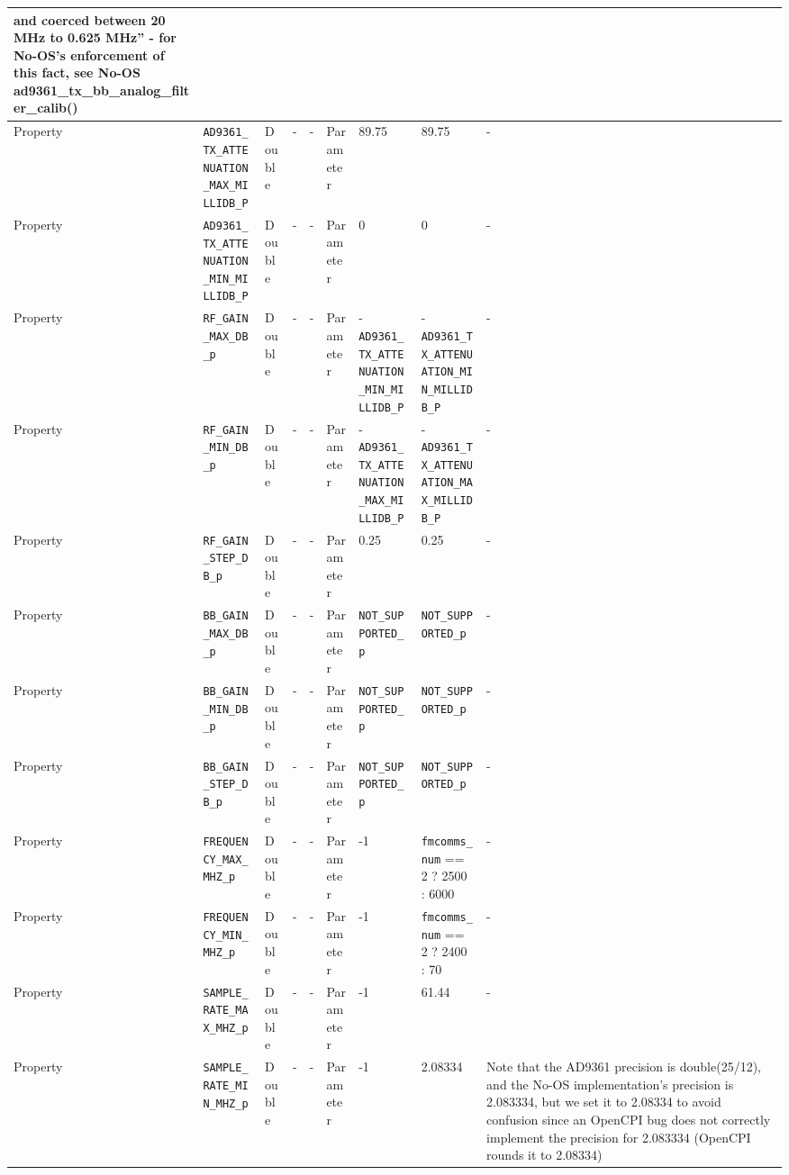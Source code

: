 \documentclass{article}
\begin{document}
\begin{landscape}
\begin{scriptsize}
\begin{longtable}{|p{1.8cm}|p{4.1cm}|p{1cm}|c|c|p{1.6cm}|p{3.7cm}|p{3.7cm}|p{2.5cm}|}
        and coerced between 20 MHz to 0.625 MHz'' - for No-OS's enforcement of
        this fact, see No-OS ad9361\_tx\_bb\_analog\_filter\_calib()  \\
			\hline
			Property     & \verb+AD9361_TX_ATTENUATION_MAX_MILLIDB_P+ & Double & -       & -          & Parameter & 89.75 & 89.75 & - \\
			\hline
			Property     & \verb+AD9361_TX_ATTENUATION_MIN_MILLIDB_P+ & Double & -       & -          & Parameter & 0 & 0 & - \\
			\hline
			Property     & \verb+RF_GAIN_MAX_DB_p+ & Double & -       & -          & Parameter & -\verb+AD9361_TX_ATTENUATION_MIN_MILLIDB_P+ & -\verb+AD9361_TX_ATTENUATION_MIN_MILLIDB_P+ & - \\
			\hline
			Property     & \verb+RF_GAIN_MIN_DB_p+ & Double & -       & -          & Parameter & -\verb+AD9361_TX_ATTENUATION_MAX_MILLIDB_P+ & -\verb+AD9361_TX_ATTENUATION_MAX_MILLIDB_P+ & - \\
			\hline
			Property     & \verb+RF_GAIN_STEP_DB_p+ & Double & -       & -          & Parameter & 0.25 & 0.25 & - \\
			\hline
			Property     & \verb+BB_GAIN_MAX_DB_p+ & Double & -       & -          & Parameter & \verb+NOT_SUPPORTED_p+ & \verb+NOT_SUPPORTED_p+ & - \\
			\hline
			Property     & \verb+BB_GAIN_MIN_DB_p+ & Double & -       & -          & Parameter & \verb+NOT_SUPPORTED_p+ & \verb+NOT_SUPPORTED_p+ & - \\
			\hline
			Property     & \verb+BB_GAIN_STEP_DB_p+ & Double & -       & -          & Parameter & \verb+NOT_SUPPORTED_p+ & \verb+NOT_SUPPORTED_p+ & - \\
			\hline
			Property     & \verb+FREQUENCY_MAX_MHZ_p+                   & Double&-        & -          & Parameter & -1 & \verb+fmcomms_num+ == 2 ? 2500 : 6000 & - \\
			\hline
			Property     & \verb+FREQUENCY_MIN_MHZ_p+                   & Double&-        & -          & Parameter & -1 & \verb+fmcomms_num+ == 2 ? 2400 : 70 & - \\
			\hline
			Property     & \verb+SAMPLE_RATE_MAX_MHZ_p+                   & Double&-        & -          & Parameter & -1 & 61.44 & - \\
			\hline
			Property     & \verb+SAMPLE_RATE_MIN_MHZ_p+                   & Double&-        & -          & Parameter & -1 & 2.08334 & Note that the AD9361 precision is double(25/12), and the No-OS implementation's precision is 2.083334, but we set it to 2.08334 to avoid confusion since an OpenCPI bug does not correctly implement the precision for 2.083334 (OpenCPI rounds it to 2.08334) \\

\end{longtable}
\end{scriptsize}
\end{landscape}
\end{document}
